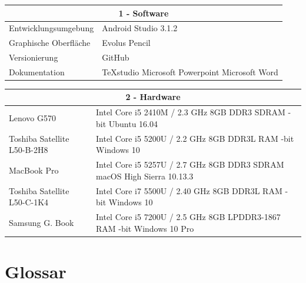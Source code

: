 \documentclass[a4paper]{scrreprt}
\begin{document}
    \begin{table}[h!]
    	\centering
    	\label{my-label}
    	\begin{tabular}{p{5.5cm}p{8.5cm}}
    		
    		\multicolumn{2}{c}{\textbf{1 - Software}} \\ \hline
    		Entwicklungsumgebung & Android Studio 3.1.2\\
    		Graphische Oberfläche& Evolus Pencil                               \\
    		Versionierung & GitHub \\
    		Dokumentation & TeXstudio \newline Microsoft Powerpoint \newline Microsoft Word \\
    		\hline
    	\end{tabular}
    \end{table}
    
    \vspace{5mm}
    
    \begin{table}[h!]
    	\centering
    	\label{my-label}
    	\begin{tabular}{p{5.5cm}p{8.5cm}}
    		
    		\multicolumn{2}{c}{\textbf{2 - Hardware}} \\ \hline
    		Lenovo G570 & Intel Core i5 2410M / 2.3 GHz \newline 8GB DDR3 SDRAM \newline 64-bit Ubuntu 16.04\\
    		Toshiba Satellite \newline L50-B-2H8 & Intel Core i5 5200U / 2.2 GHz \newline 8GB DDR3L RAM \newline 64-bit Windows 10                              \\
    		MacBook Pro & Intel Core i5 5257U / 2.7 GHz \newline 8GB DDR3 SDRAM \newline macOS High Sierra 10.13.3\\ 
    		Toshiba Satellite \newline L50-C-1K4 & Intel Core i7 5500U / 2.40 GHz \newline 8GB DDR3L RAM \newline 64-bit Windows 10\\ 
    		Samsung G. Book & Intel Core i5 7200U / 2.5 GHz \newline 8GB LPDDR3-1867 RAM \newline 64-bit Windows 10 Pro \\
    		\hline
    	\end{tabular}
    \end{table}

	\chapter{Glossar}
	
    \glsaddall
    \printglossaries

    \listoffigures
\end{document}

